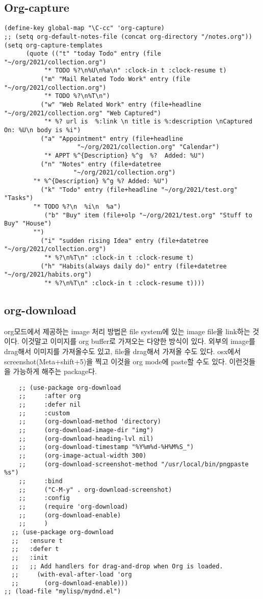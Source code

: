 \documentclass[11pt]{article}
\begin{document}
\subsection*{Org-capture}
\label{sec:org39f98bc}
\begin{verbatim}
(define-key global-map "\C-cc" 'org-capture)
;; (setq org-default-notes-file (concat org-directory "/notes.org"))
(setq org-capture-templates
      (quote (("t" "today Todo" entry (file "~/org/2021/collection.org")
	       "* TODO %?\n%U\n%a\n" :clock-in t :clock-resume t)
	      ("m" "Mail Related Todo Work" entry (file "~/org/2021/collection.org")
	       "* TODO %?\n%T\n")
	      ("w" "Web Related Work" entry (file+headline "~/org/2021/collection.org" "Web Captured")
	       "* %? url is  %:link \n title is %:description \nCaptured On: %U\n body is %i")
	      ("a" "Appointment" entry (file+headline 
					"~/org/2021/collection.org" "Calendar") 
	       "* APPT %^{Description} %^g  %?  Added: %U") 
	      ("n" "Notes" entry (file+datetree 
				   "~/org/2021/collection.org")
		"* %^{Description} %^g %? Added: %U")
	      ("k" "Todo" entry (file+headline "~/org/2021/test.org" "Tasks")
		"* TODO %?\n  %i\n  %a")
	       ("b" "Buy" item (file+olp "~/org/2021/test.org" "Stuff to Buy" "House")
		"")
	      ("i" "sudden rising Idea" entry (file+datetree "~/org/2021/collection.org")
	       "* %?\n%T\n" :clock-in t :clock-resume t)
	      ("h" "Habits(always daily do)" entry (file+datetree "~/org/2021/habits.org")
	       "* %?\n%T\n" :clock-in t :clock-resume t))))

\end{verbatim}

\subsection*{org-download}
\label{sec:orgc15334e}
org모드에서 제공하는 image 처리 방법은 file system에 있는 image file을 link하는 것이다. 이것말고 이미지를  org buffer로 가져오는 다양한 방식이 있다. 외부의 image를 drag해서 이미지를 가져올수도 있고, file을 drag해서 가져올 수도 있다. osx에서 screenshot(Meta+shift+5)을 찍고 이것을 org mode에 paste할 수도 있다. 이런것들을 가능하게 해주는 package다.
\begin{verbatim}
    ;; (use-package org-download
    ;;     :after org
    ;;     :defer nil
    ;;     :custom
    ;;     (org-download-method 'directory)
    ;;     (org-download-image-dir "img")
    ;;     (org-download-heading-lvl nil)
    ;;     (org-download-timestamp "%Y%m%d-%H%M%S_")
    ;;     (org-image-actual-width 300)
    ;;     (org-download-screenshot-method "/usr/local/bin/pngpaste %s")
    ;;     :bind
    ;;     ("C-M-y" . org-download-screenshot)
    ;;     :config
    ;;     (require 'org-download)
    ;;     (org-download-enable)
    ;;     )
  ;; (use-package org-download
  ;;   :ensure t
  ;;   :defer t
  ;;   :init
  ;;   ;; Add handlers for drag-and-drop when Org is loaded.
  ;;     (with-eval-after-load 'org
  ;;       (org-download-enable)))
;; (load-file "mylisp/mydnd.el")

\end{verbatim}
\end{document}
